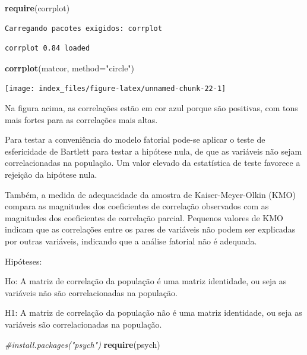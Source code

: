 \documentclass[12pt,brazil,oneside]{book}
\newenvironment{Shaded}{\begin{snugshade}}{\end{snugshade}}
\newcommand{\CommentTok}[1]{\textcolor[rgb]{0.56,0.35,0.01}{\textit{#1}}}
\newcommand{\DataTypeTok}[1]{\textcolor[rgb]{0.13,0.29,0.53}{#1}}
\newcommand{\KeywordTok}[1]{\textcolor[rgb]{0.13,0.29,0.53}{\textbf{#1}}}
\newcommand{\NormalTok}[1]{#1}
\newcommand{\StringTok}[1]{\textcolor[rgb]{0.31,0.60,0.02}{#1}}
\begin{document}
\begin{Shaded}
\begin{Highlighting}[]
\KeywordTok{require}\NormalTok{(corrplot)}
\end{Highlighting}
\end{Shaded}

\begin{verbatim}
Carregando pacotes exigidos: corrplot
\end{verbatim}

\begin{verbatim}
corrplot 0.84 loaded
\end{verbatim}

\begin{Shaded}
\begin{Highlighting}[]
\KeywordTok{corrplot}\NormalTok{(matcor, }\DataTypeTok{method=}\StringTok{"circle"}\NormalTok{)}
\end{Highlighting}
\end{Shaded}

\begin{center}\texttt{[image: index\_files/figure-latex/unnamed-chunk-22-1]} \end{center}

Na figura acima, as correlações estão em cor azul porque são positivas,
com tons mais fortes para as correlações mais altas.

Para testar a conveniência do modelo fatorial pode-se aplicar o teste de
esfericidade de Bartlett para testar a hipótese nula, de que as
variáveis não sejam correlacionadas na população. Um valor elevado da
estatística de teste favorece a rejeição da hipótese nula.

Também, a medida de adequacidade da amostra de Kaiser-Meyer-Olkin (KMO)
compara as magnitudes dos coeficientes de correlação observados com as
magnitudes dos coeficientes de correlação parcial. Pequenos valores de
KMO indicam que as correlações entre os pares de variáveis não podem ser
explicadas por outras variáveis, indicando que a análise fatorial não é
adequada.

Hipóteses:

Ho: A matriz de correlação da população é uma matriz identidade, ou seja
as variáveis não são correlacionadas na população.

H1: A matriz de correlação da população não é uma matriz identidade, ou
seja as variáveis são correlacionadas na população.

\begin{Shaded}
\begin{Highlighting}[]
\CommentTok{#install.packages("psych")}
\KeywordTok{require}\NormalTok{(psych)}
\end{Highlighting}
\end{Shaded}
\end{document}
